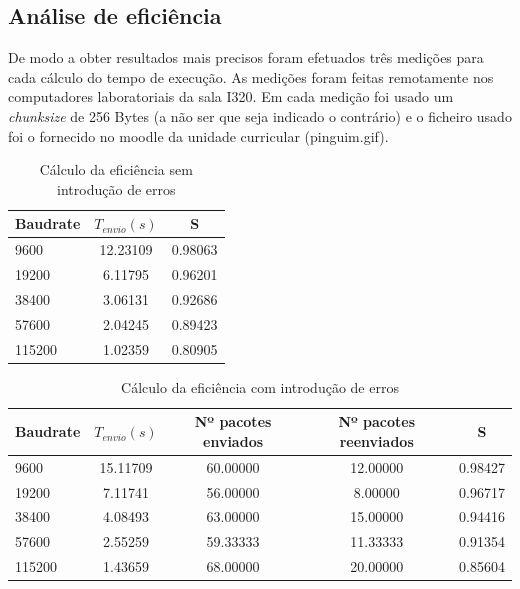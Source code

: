 \documentclass[11pt]{report}
\begin{document}
\subsection{Análise de eficiência}

De modo a obter resultados mais precisos foram efetuados três medições
para cada cálculo do tempo de execução. As medições foram feitas remotamente
nos computadores laboratoriais da sala I320. Em cada medição foi usado um
\textit{chunksize} de 256 Bytes (a não ser que seja indicado o contrário)
e o ficheiro usado foi o fornecido no moodle da unidade curricular
(pinguim.gif).
\begin{table}[h!]
  \begin{center}
    \caption{Cálculo da eficiência sem introdução de erros}
    \label{tab:table1}
    \begin{tabular}{l|c|c} %
        Baudrate & \textbf{$  T_{envio} (s) $} & S \\
      \hline
        9600 & 12.23109 & 0.98063\\
        19200 & 6.11795 & 0.96201\\
        38400 & 3.06131 & 0.92686\\
        57600 & 2.04245 & 0.89423\\
        115200 & 1.02359 & 0.80905\\
    \end{tabular}
  \end{center}
\end{table}

\begin{table}[h!]
  \begin{center}
    \caption{Cálculo da eficiência com introdução de erros}
    \label{tab:table1}
    \begin{tabular}{l|c|c|c|c} %
        Baudrate & \textbf{$  T_{envio} (s) $} & Nº pacotes enviados & Nº pacotes reenviados & S\\
      \hline
        9600 & 15.11709 & 60.00000 & 12.00000 & 0.98427\\
        19200 & 7.11741 & 56.00000 & 8.00000 & 0.96717\\
        38400 & 4.08493 & 63.00000 & 15.00000 & 0.94416\\
        57600 & 2.55259 & 59.33333 & 11.33333 & 0.91354\\
        115200 & 1.43659 & 68.00000 & 20.00000 & 0.85604\\
    \end{tabular}
  \end{center}
\end{table}
\end{document}
